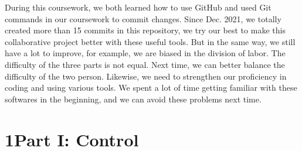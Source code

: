 \documentclass[a4paper,11pt,reqno]{amsart}
\begin{document}
    During this coursework, we both learned how to use GitHub and used Git commands in our coursework to commit changes. Since Dec. 2021, we totally created more than 15 commits in this repository, we try our best to make this collaborative project better with these useful tools.
    But in the same way, we still have a lot to improve, for example, we are biased in the division of labor. The difficulty of the three parts is not equal. Next time, we can better balance the difficulty of the two person. 
    Likewise, we need to strengthen our proficiency in coding and using various tools. We spent a lot of time getting familiar with these softwares in the beginning, and we can avoid these problems next time.
    \vspace*{\fill}
\newpage


\section*{\Large\textbf{1\quad Part I: Control}}


\end{document}
